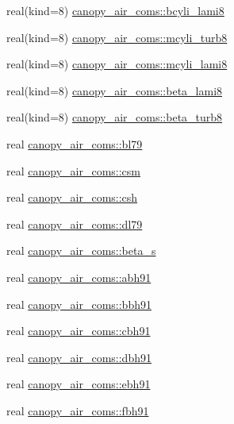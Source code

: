 \begin{DoxyCompactItemize}
\item 
real(kind=8) \hyperlink{namespacecanopy__air__coms_ad7c65a1b664eb04c6665e7d5a9fc5380}{canopy\+\_\+air\+\_\+coms\+::bcyli\+\_\+lami8}
\item 
real(kind=8) \hyperlink{namespacecanopy__air__coms_ad1cdd46134a9b31835e735884f28e3d0}{canopy\+\_\+air\+\_\+coms\+::mcyli\+\_\+turb8}
\item 
real(kind=8) \hyperlink{namespacecanopy__air__coms_a2c460170035d9a0e3fd4458a165411f2}{canopy\+\_\+air\+\_\+coms\+::mcyli\+\_\+lami8}
\item 
real(kind=8) \hyperlink{namespacecanopy__air__coms_a9493ec4099bf6cd11334e808cd169e72}{canopy\+\_\+air\+\_\+coms\+::beta\+\_\+lami8}
\item 
real(kind=8) \hyperlink{namespacecanopy__air__coms_a42dff1bd5a176d0269c6456ecbd1be1d}{canopy\+\_\+air\+\_\+coms\+::beta\+\_\+turb8}
\item 
real \hyperlink{namespacecanopy__air__coms_ac5812d4be4754c78cd9f1aad023660ba}{canopy\+\_\+air\+\_\+coms\+::bl79}
\item 
real \hyperlink{namespacecanopy__air__coms_a7f257392c2baec6b0f4fe27bd17f809d}{canopy\+\_\+air\+\_\+coms\+::csm}
\item 
real \hyperlink{namespacecanopy__air__coms_aea71c9950d7caa44dcaae548a1d02058}{canopy\+\_\+air\+\_\+coms\+::csh}
\item 
real \hyperlink{namespacecanopy__air__coms_a74b9e27e0f352ab01d8e4aaa567ad2ce}{canopy\+\_\+air\+\_\+coms\+::dl79}
\item 
real \hyperlink{namespacecanopy__air__coms_a1b58671dba4d2fefd5790694e6563f7c}{canopy\+\_\+air\+\_\+coms\+::beta\+\_\+s}
\item 
real \hyperlink{namespacecanopy__air__coms_a8943107817bd72a2ecf2c8ac35516efc}{canopy\+\_\+air\+\_\+coms\+::abh91}
\item 
real \hyperlink{namespacecanopy__air__coms_a19448a094bac99003898bfd3170277e3}{canopy\+\_\+air\+\_\+coms\+::bbh91}
\item 
real \hyperlink{namespacecanopy__air__coms_ae0cae45535d33e82cf2fe8547c1d8dc2}{canopy\+\_\+air\+\_\+coms\+::cbh91}
\item 
real \hyperlink{namespacecanopy__air__coms_a1b28513486b59cf5dc849476f8a8fb8b}{canopy\+\_\+air\+\_\+coms\+::dbh91}
\item 
real \hyperlink{namespacecanopy__air__coms_a3499170cfdc0dbef4966b323d442e71a}{canopy\+\_\+air\+\_\+coms\+::ebh91}
\item 
real \hyperlink{namespacecanopy__air__coms_ac7b57b769f421b5bb07a3ec88e5c6883}{canopy\+\_\+air\+\_\+coms\+::fbh91}

\end{DoxyCompactItemize}

